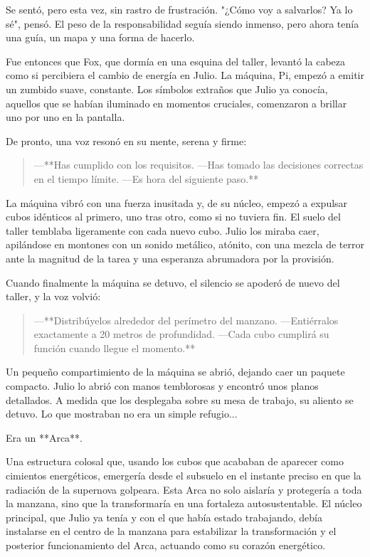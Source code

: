 \documentclass[a4paper,12pt]{book}
\begin{document}
Se sentó, pero esta vez, sin rastro de frustración. "¿Cómo voy a salvarlos? Ya lo sé", pensó. El peso de la responsabilidad seguía siendo inmenso, pero ahora tenía una guía, un mapa y una forma de hacerlo.

Fue entonces que Fox, que dormía en una esquina del taller, levantó la cabeza como si percibiera el cambio de energía en Julio. La máquina, Pi, empezó a emitir un zumbido suave, constante. Los símbolos extraños que Julio ya conocía, aquellos que se habían iluminado en momentos cruciales, comenzaron a brillar uno por uno en la pantalla.

De pronto, una voz resonó en su mente, serena y firme:

\begin{quote}
    —**Has cumplido con los requisitos. —Has tomado las decisiones correctas en el tiempo límite. —Es hora del siguiente paso.**
\end{quote}

La máquina vibró con una fuerza inusitada y, de su núcleo, empezó a expulsar cubos idénticos al primero, uno tras otro, como si no tuviera fin. El suelo del taller temblaba ligeramente con cada nuevo cubo. Julio los miraba caer, apilándose en montones con un sonido metálico, atónito, con una mezcla de terror ante la magnitud de la tarea y una esperanza abrumadora por la provisión.

Cuando finalmente la máquina se detuvo, el silencio se apoderó de nuevo del taller, y la voz volvió:

\begin{quote}
    —**Distribúyelos alrededor del perímetro del manzano. —Entiérralos exactamente a 20 metros de profundidad. —Cada cubo cumplirá su función cuando llegue el momento.**
\end{quote}

Un pequeño compartimiento de la máquina se abrió, dejando caer un paquete compacto. Julio lo abrió con manos temblorosas y encontró unos planos detallados. A medida que los desplegaba sobre su mesa de trabajo, su aliento se detuvo. Lo que mostraban no era un simple refugio...

Era un **Arca**.

Una estructura colosal que, usando los cubos que acababan de aparecer como cimientos energéticos, emergería desde el subsuelo en el instante preciso en que la radiación de la supernova golpeara. Esta Arca no solo aislaría y protegería a toda la manzana, sino que la transformaría en una fortaleza autosustentable. El núcleo principal, que Julio ya tenía y con el que había estado trabajando, debía instalarse en el centro de la manzana para estabilizar la transformación y el posterior funcionamiento del Arca, actuando como su corazón energético.
\end{document}
